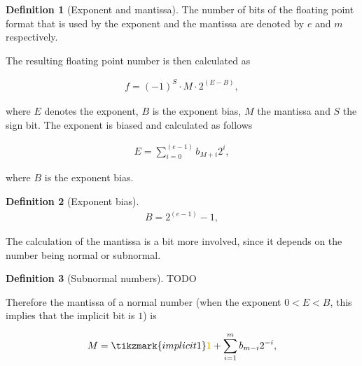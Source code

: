 \documentclass{article}
\theoremstyle{definition}
\newtheorem{definition}{Definition}[section]
\numberwithin{equation}{section}
\begin{document}
\begin{definition}[Exponent and mantissa]

The number of bits of the floating point format that is used by the exponent and the mantissa are denoted by $e$ and $m$ respectively.

\end{definition}

The resulting floating point number is then calculated as

\begin{align*}
    f = (-1)^S \cdot M \cdot 2^{(E-B)},
\end{align*}

where $E$ denotes the exponent, $B$ is the exponent bias, $M$ the mantissa and $S$ the sign bit. The exponent is biased and calculated as follows

\begin{align}
    E = \sum_{i=0}^{(e-1)} b_{M+i} 2^i, \label{eq:exponent}
\end{align}

where $B$ is the exponent bias.

\begin{definition}[Exponent bias]

\begin{align*}
    B = 2^{(e-1)} -1,
\end{align*}

\end{definition}

The calculation of the mantissa is a bit more involved, since it depends on the number being normal or subnormal.

\begin{definition}[Subnormal numbers]

TODO

\end{definition}

Therefore the mantissa of a normal number (when the exponent $0<E<B$, this implies that the implicit bit is $1$) is

\begin{align*}
    M = \tikzmark{implicit1}\textcolor{cyellow}{1} + \sum_{i=1}^{m} b_{m-i} 2^{-i}, \label{eq:mantissa}
\end{align*}

\end{document}
